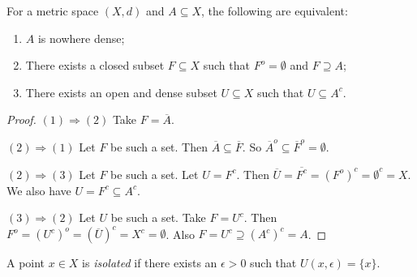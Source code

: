     \begin{proposition}\label{prop:nowhere-dense-properties}
        For a metric space $(X,d)$ and $A \subseteq X$, the following are equivalent:
            \begin{enumerate}[label = (\arabic*),itemsep=1pt,topsep=3pt]
                \item $A$ is nowhere dense;
                \item There exists a closed subset $F \subseteq X$ such that $F^o = \emptyset$ and $F \supseteq A$;
                \item There exists an open and dense subset $U \subseteq X$ such that $U \subseteq A^c$.
            \end{enumerate}
    \end{proposition}
        \begin{proof}
            $(1)\Rightarrow(2)$ Take $F = \overline{A}$.

            $(2)\Rightarrow(1)$ Let $F$ be such a set. Then $\overline{A} \subseteq \overline{F}$. So $\overline{A}^o \subseteq \overline{F}^o = \emptyset$.

            $(2)\Rightarrow(3)$ Let $F$ be such a set. Let $U = F^c$. Then $\overline{U} = \overline{F^c} = (F^o)^c = \emptyset^c = X$. We also have $U = F^c \subseteq A^c$. 

            $(3)\Rightarrow(2)$ Let $U$ be such a set. Take $F = U^c$. Then $F^o = (U^c)^o = (\overline{U})^c = X^c = \emptyset$. Also $F = U^c \supseteq (A^c)^c = A$.
        \end{proof}

    \begin{definition}
        A point $x \in X$ is \textit{isolated} if there exists an $\epsilon > 0$ such that $U(x,\epsilon) = \{x\}$.
    \end{definition}

